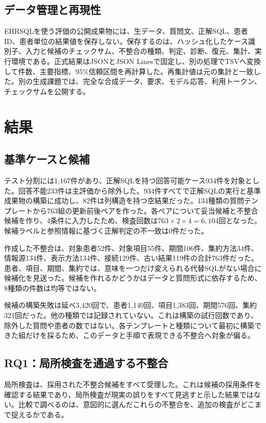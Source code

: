 \documentclass[manuscript,review,anonymous]{acmart}
\begin{document}
\subsection{データ管理と再現性}

EHRSQLを使う評価の公開成果物には、生データ、質問文、正解SQL、患者ID、患者単位の結果値を保存しない。保存するのは、ハッシュ化したケース識別子、入力と候補のチェックサム、不整合の種類、判定、診断、復元、集計、実行環境である。正式結果はJSONとJSON Linesで固定し、別の処理でTSVへ変換して件数、主要指標、95\%信頼区間を再計算した。再集計値は元の集計と一致した。別の生成課題では、完全な合成データ、要求、モデル応答、利用トークン、チェックサムを公開する。

\section{結果}

\subsection{基準ケースと候補}

テスト分割には1,167件があり、正解SQLを持つ回答可能ケース934件を対象とした。回答不能233件は主評価から除外した。934件すべてで正解SQLの実行と基準成果物の構築に成功し、82件は列構造を持つ空結果だった。134種類の質問テンプレートから763組の更新前後ペアを作った。各ペアについて妥当候補と不整合候補を作り、4条件に入力したため、検査回数は$763\times2\times4=6,104$回となった。候補ラベルと参照情報に基づく正解判定の不一致は0件だった。

作成した不整合は、対象患者52件、対象項目55件、期間106件、集約方法34件、情報源134件、表示方法134件、接続129件、古い結果119件の合計763件だった。患者、項目、期間、集約では、意味を一つだけ変えられる代替SQLがない場合に候補化を見送った。候補を作れるかどうかはデータと質問形式に依存するため、8種類の件数は均等ではない。

候補の構築失敗は延べ3,420回で、患者1,140回、項目1,383回、期間576回、集約321回だった。他の種類では記録されていない。これは構築の試行回数であり、除外した質問や患者の数ではない。各テンプレートと種類について最初に構築できた組だけを採るため、このデータと手順で表現できる不整合へ対象が偏る。

\subsection{RQ1：局所検査を通過する不整合}

局所検査は、採用された不整合候補をすべて受理した。これは候補の採用条件を確認する結果であり、局所検査が現実の誤りをすべて見逃すと示した結果ではない。比較で調べるのは、意図的に選んだこれらの不整合を、追加の検査がどこまで捉えるかである。
\end{document}
